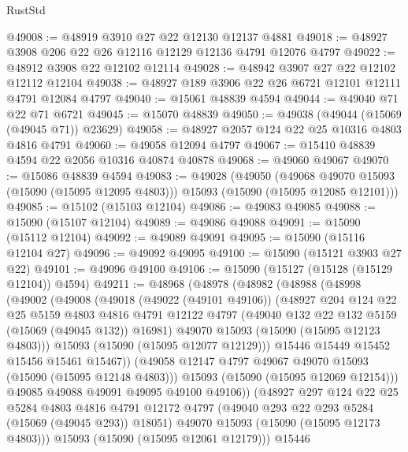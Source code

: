 \begin{lexlean}{RustStd}
\begin{coremodule}
@49008 := @48919 @3910 @27 @22 @12130 @12137 @4881
@49018 := @48927 @3908 @206 @22 @26 @12116 @12129 @12136 @4791 @12076 @4797
@49022 := @48912 @3908 @22 @12102 @12114
@49028 := @48942 @3907 @27 @22 @12102 @12112 @12104
@49038 := @48927 @189 @3906 @22 @26 @6721 @12101 @12111 @4791 @12084 @4797
@49040 := @15061 @48839 @4594
@49044 := @49040 @71 @22 @71 @6721
@49045 := @15070 @48839
@49050 := @49038 (@49044 (@15069 (@49045 @71)) @23629)
@49058 := @48927 @2057 @124 @22 @25 @10316 @4803 @4816 @4791
@49060 := @49058 @12094 @4797
@49067 := @15410 @48839 @4594 @22 @2056 @10316 @40874 @40878
@49068 := @49060 @49067
@49070 := @15086 @48839 @4594
@49083 := @49028
    (@49050
      (@49068 @49070 @15093 (@15090 (@15095 @12095 @4803)))
      @15093
      (@15090 (@15095 @12085 @12101)))
@49085 := @15102 (@15103 @12104)
@49086 := @49083 @49085
@49088 := @15090 (@15107 @12104)
@49089 := @49086 @49088
@49091 := @15090 (@15112 @12104)
@49092 := @49089 @49091
@49095 := @15090 (@15116 @12104 @27)
@49096 := @49092 @49095
@49100 := @15090 (@15121 @3903 @27 @22)
@49101 := @49096 @49100
@49106 := @15090 (@15127 (@15128 (@15129 @12104)) @4594)
@49211 := @48968
    (@48978
      (@48982
        (@48988
          (@48998
            (@49002
              (@49008
                (@49018
                  (@49022 (@49101 @49106))
                  (@48927
                    @204
                    @124
                    @22
                    @25
                    @5159
                    @4803
                    @4816
                    @4791
                    @12122
                    @4797
                    (@49040 @132 @22 @132 @5159 (@15069 (@49045 @132)) @16981)
                    @49070
                    @15093
                    (@15090 (@15095 @12123 @4803)))
                  @15093
                  (@15090 (@15095 @12077 @12129)))
                @15446
                @15449
                @15452
                @15456
                @15461
                @15467))
            (@49058 @12147 @4797 @49067 @49070 @15093 (@15090 (@15095 @12148 @4803)))
            @15093
            (@15090 (@15095 @12069 @12154)))
          @49085
          @49088
          @49091
          @49095
          @49100
          @49106))
      (@48927
        @297
        @124
        @22
        @25
        @5284
        @4803
        @4816
        @4791
        @12172
        @4797
        (@49040 @293 @22 @293 @5284 (@15069 (@49045 @293)) @18051)
        @49070
        @15093
        (@15090 (@15095 @12173 @4803)))
      @15093
      (@15090 (@15095 @12061 @12179)))
    @15446

\end{coremodule}
\end{lexlean}

